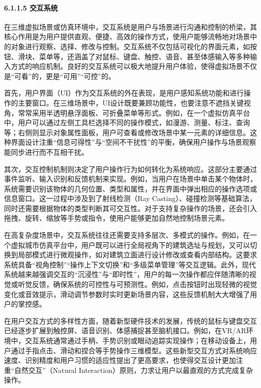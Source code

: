 \hypertarget{ux4ea4ux4e92ux7cfbux7edf}{%
\paragraph{6.1.1.5 交互系统}\label{ux4ea4ux4e92ux7cfbux7edf}}

在三维虚拟场景或仿真环境中，交互系统是用户与场景进行沟通和控制的桥梁，其核心作用是为用户提供直观、便捷、高效的操作方式，使用户能够流畅地对场景中的对象进行观察、选择、修改与控制。交互系统不仅包括可视化的界面元素，如按钮、滑块、菜单等，还涵盖了对鼠标、键盘、触控、语音、甚至体感输入等多种输入方式的响应机制。良好的交互系统可以极大地提升用户体验，使得虚拟场景不仅是``可看''的，更是``可用''``可控''的。

首先，用户界面（UI）作为交互系统的外在表现，是用户感知系统功能和进行操作的主要窗口。在三维场景中，UI设计既要兼顾功能性，也要注意不遮挡关键视角，常常采用半透明悬浮面板、可折叠菜单等形式。例如，在一个虚拟仿真平台中，用户可以通过左侧工具栏选择不同的操作模式，如漫游、测量、标注、查询等；右侧则显示对象属性面板，用户可查看或修改场景中某一元素的详细信息。这种界面设计注重``信息可得性''与``空间不干扰性''的平衡，确保用户操作与场景观察能同步进行而不互相干扰。

其次，交互控制机制则决定了用户操作行为如何转化为系统响应。这部分主要通过事件监听、输入识别和反馈机制来实现。例如，当用户在场景中单击某个物体时，系统需要识别该物体的几何位置、类型和属性，并在界面中弹出相应的操作选项或信息窗口。这一过程中涉及到了射线检测（Ray Casting）、碰撞检测等基础算法，同时还需要根据物体的类型判断其可交互性。对于支持复杂操作的场景，还会引入拖拽、旋转、缩放等手势或指令，使用户能够更加自然地控制场景元素。

在高复杂度场景中，交互系统往往还需要支持多层次、多模式的操作。例如，在一个虚拟城市仿真平台中，用户既可以进行全局视角下的建筑选址与规划，又可以切换到局部模式进行微观操作，如对建筑立面进行设计修改或查看内部结构。这要求系统具备``视角控制''``操作上下文切换''和``多级菜单管理''等交互逻辑。此外，现代系统越来越强调交互的``沉浸性''与``即时性''，用户的每一次操作都应伴随清晰的视觉或听觉反馈，确保系统的可控性与可预测性。例如，点击按钮时出现轻微的视觉变化或音效提示，滑动调节参数时实时更新场景内容，这些反馈机制大大增强了用户的掌控感。

在用户交互方式的多样性方面，随着新型硬件技术的发展，传统的鼠标与键盘交互已经逐步扩展到触控屏、语音识别、体感捕捉甚至脑机接口。例如，在VR/AR环境中，交互系统通常通过手柄、手势识别或眼动追踪实现操作；在移动设备上，用户通过手指点击、滑动和捏合等手势操作三维模型。这些新型交互方式对系统响应速度、识别精度和用户习惯的适应性提出了更高要求，也使得交互设计更加注重``自然交互''（Natural Interaction）原则，力求让用户以最直观的方式完成复杂操作。

